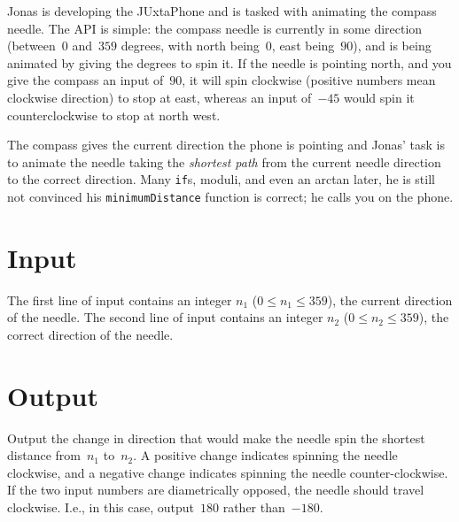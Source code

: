 
%
\noindent
Jonas is developing the JUxtaPhone and is tasked with animating the
compass needle.  The API is simple: the compass needle is currently in some
direction (between~$0$ and~$359$ degrees, with north being~$0$, east being~$90$),
and is being animated by giving the degrees to spin it.
%
If the needle is pointing north, and you give the compass an input of~$90$, it
will spin clockwise (positive numbers mean clockwise direction) to stop at
east, whereas an input of~$-45$ would spin it counterclockwise to stop at north
west.

The compass gives the current direction the phone is pointing and Jonas'
task is to animate the needle taking the \emph{shortest path} from the current needle
direction to the correct direction.  Many \texttt{if}s, moduli, and even an arctan
later, he is still not convinced his \texttt{minimumDistance} function is
correct; he calls you on the phone.

\section*{Input}

The first line of input contains an integer $n_1$ ($0 \le n_1 \le
359$), the current direction of the needle.  The second line of input
contains an integer $n_2$ ($0 \le n_2 \le 359$), the correct direction
of the needle.

\section*{Output}
Output the change in direction that would make the needle spin the shortest distance from~$n_1$
to~$n_2$.  A positive change indicates spinning the needle clockwise, and a negative change indicates spinning the needle counter-clockwise.
%
If the two input numbers are diametrically opposed, the needle should travel
clockwise.  I.e., in this case, output~$180$ rather than~$-180$. %
